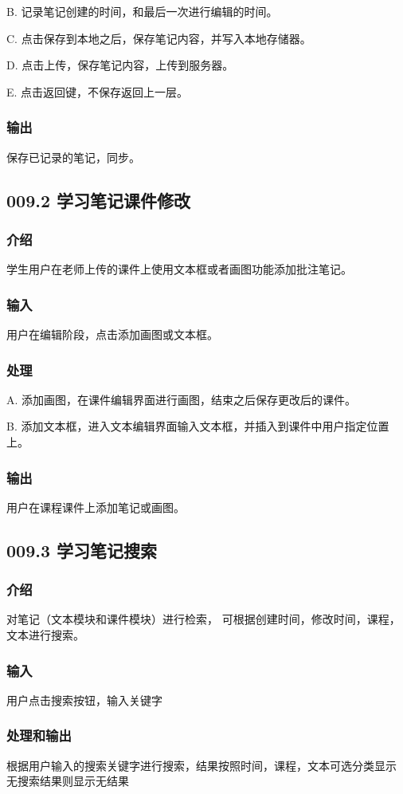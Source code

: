 	B. 记录笔记创建的时间，和最后一次进行编辑的时间。

	C. 点击保存到本地之后，保存笔记内容，并写入本地存储器。

	D. 点击上传，保存笔记内容，上传到服务器。

	E. 点击返回键，不保存返回上一层。
    \subsubsection{输出}
	保存已记录的笔记，同步。
 \subsection{009.2 学习笔记课件修改}
    \subsubsection{介绍}
	学生用户在老师上传的课件上使用文本框或者画图功能添加批注笔记。
    \subsubsection{输入}
	用户在编辑阶段，点击添加画图或文本框。
    \subsubsection{处理}
	A. 添加画图，在课件编辑界面进行画图，结束之后保存更改后的课件。

	B. 添加文本框，进入文本编辑界面输入文本框，并插入到课件中用户指定位置上。
    \subsubsection{输出}
	用户在课程课件上添加笔记或画图。

 \subsection{009.3 学习笔记搜索}
    \subsubsection{介绍}
	对笔记（文本模块和课件模块）进行检索，
可根据创建时间，修改时间，课程，文本进行搜索。
    \subsubsection{输入}
	用户点击搜索按钮，输入关键字
    \subsubsection{处理和输出}
	根据用户输入的搜索关键字进行搜索，结果按照时间，课程，文本可选分类显示
无搜索结果则显示无结果


